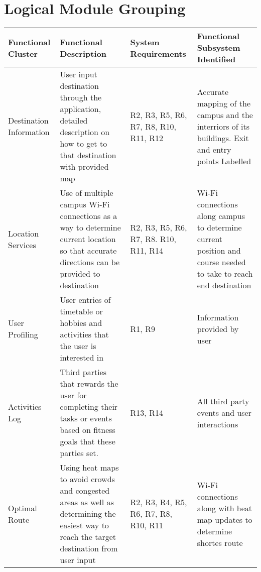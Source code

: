 \documentclass[11pt]{article}
\begin{document}
\section{Logical Module Grouping}

\begin{table}[hb]
\centering
\bigskip
	\begin{tabular}{|p{1.25in}|p{1.3in}|p{0.7in}|p{1.3in}|}
	\hline
		Functional Cluster & Functional Description & System Requirements & 			Functional Subsystem Identified\\
	\hline
		Destination Information & User input destination through the 					application, detailed description on how to get to that 						destination with provided map & R2, R3, R5, R6, R7, R8, R10, 					R11, R12 & Accurate mapping of the campus and the interriors of 				its buildings. Exit and entry points Labelled\\
	\hline
		Location Services & Use of multiple campus Wi-Fi connections as a way 			to determine current location so that accurate directions can be 				provided to destination & R2, R3, R5, R6, R7, R8. R10, R11, R14 & Wi-Fi 		connections along campus to determine current position and course 				needed to take to reach end destination\\
	\hline
		User Profiling & User entries of timetable or hobbies and activities 			that the user is interested in & R1, R9 & Information provided by 
		user\\
	\hline
		Activities Log & Third parties that rewards the user for completing 			their tasks or events based on fitness goals that these parties set. & 			R13, R14 & 	All third party events and user interactions\\
	\hline
		Optimal Route & Using heat maps to avoid crowds and congested areas as 			well as determining the easiest way to reach the target destination 			from user input & R2, R3, R4, R5, R6, R7, R8, R10, R11 & Wi-Fi 					connections along with 	heat map updates to determine shortes route\\
	\hline
	\end{tabular}
\end{table}
\end{document}
